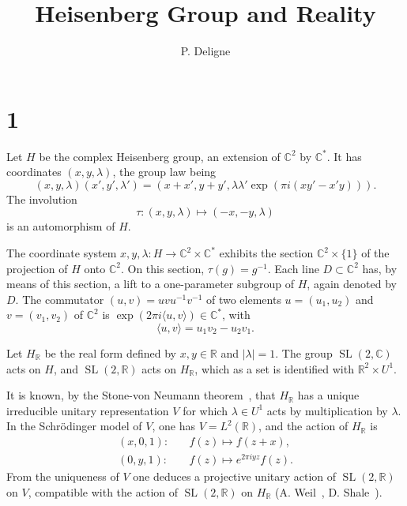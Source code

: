 \documentclass[11pt]{article}
\title{Heisenberg Group and Reality}
\author{P. Deligne}
\date{}
\newcommand{\C}{\mathbb C}
\newcommand{\R}{\mathbb R}
\DeclareMathOperator{\SL}{SL}
\begin{document}
\maketitle

\section*{1}
Let $H$ be the complex Heisenberg group, an extension of $\C^2$ by $\C^*$. It has coordinates $(x,y,\lambda)$, the group law being
\begin{equation}\tag{1.1}
(x,y,\lambda)(x',y',\lambda')=(x+x',y+y',\lambda\lambda'\exp(\pi i(xy'-x'y))).
\end{equation}
The involution
\begin{equation}\tag{1.2}
\tau:(x,y,\lambda)\longmapsto (-x,-y,\lambda)
\end{equation}
is an automorphism of $H$.

The coordinate system $x,y,\lambda:H\to \C^2\times\C^*$ exhibits the section $\C^2\times\{1\}$ of the projection of $H$ onto $\C^2$. On this section, $\tau(g)=g^{-1}$. Each line $D\subset \C^2$ has, by means of this section, a lift to a one-parameter subgroup of $H$, again denoted by $D$. The commutator $(u,v)=uvu^{-1}v^{-1}$ of two elements $u=(u_1,u_2)$ and $v=(v_1,v_2)$ of $\C^2$ is $\exp(2\pi i\langle u,v\rangle)\in\C^*$, with
\begin{equation}\tag{1.3}
\langle u,v\rangle=u_1v_2-u_2v_1 .
\end{equation}

Let $H_\R$ be the real form defined by $x,y\in\R$ and $|\lambda|=1$. The group $\SL(2,\C)$ acts on $H$, and $\SL(2,\R)$ acts on $H_\R$, which as a set is identified with $\R^2\times U^1$.

It is known, by the Stone-von Neumann theorem~\cite{vonNeumann}, that $H_\R$ has a unique irreducible unitary representation $V$ for which $\lambda\in U^1$ acts by multiplication by $\lambda$. In the Schr\"odinger model of $V$, one has $V=L^2(\R)$, and the action of $H_\R$ is
\begin{equation}\tag{1.4}
\begin{aligned}
(x,0,1):&\quad f(z)\longmapsto f(z+x),\\
(0,y,1):&\quad f(z)\longmapsto e^{2\pi i yz}f(z).
\end{aligned}
\end{equation}
From the uniqueness of $V$ one deduces a projective unitary action of $\SL(2,\R)$ on $V$, compatible with the action of $\SL(2,\R)$ on $H_\R$ (A. Weil~\cite{Weil}, D. Shale~\cite{Shale}).
\end{document}
